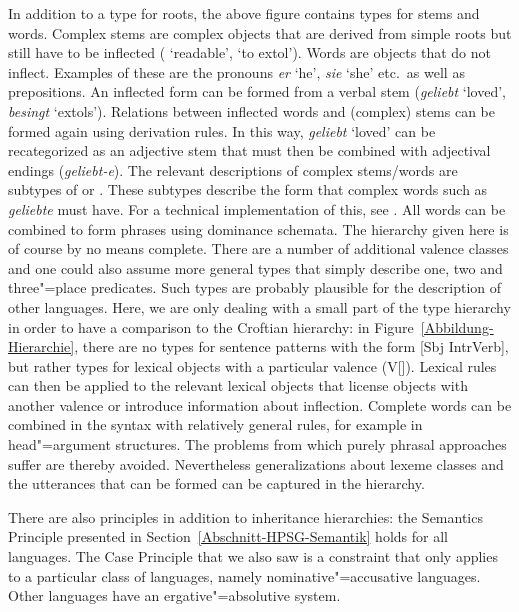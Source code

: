 In addition to a type for roots, the above figure contains types for stems and words. Complex stems are complex objects that are
derived from simple roots but still have to be inflected ( `readable',  `to extol'). Words are objects that do not inflect. Examples of these
are the pronouns \emph{er} `he', \emph{sie} `she' etc.\ as well as prepositions. An inflected form can be formed from a verbal stem
(\emph{geliebt} `loved', \emph{besingt} `extols'). Relations between inflected words and (complex) stems can be formed again using derivation rules. 
In this way, \emph{geliebt} `loved' can be recategorized as an adjective stem that must then be combined with adjectival endings (\emph{geliebt-e}).
The relevant descriptions of complex stems/words are subtypes of 
or . These subtypes describe the form that complex words such as \emph{geliebte} must have. For a technical implementation of this, see
. All words can be combined to form phrases using dominance schemata. The hierarchy given here is of course by no means complete.
There are a number of additional valence classes and one could also assume more general types that simply describe one, two and three"=place predicates. 
Such types are probably plausible for the description of other languages. Here, we are only dealing with a small part of the type hierarchy in order to have
a comparison to the Croftian hierarchy: in Figure~\ref{Abbildung-Hierarchie}, there are no types for
sentence patterns with the form
[Sbj IntrVerb], but rather types for lexical objects with a particular valence
(V[\subcat {}]). Lexical rules can then be applied to the relevant lexical objects that license objects with another valence or introduce
information about inflection. Complete words can be combined in the syntax with relatively general rules, for example in head"=argument structures. The problems
from which purely phrasal approaches suffer are thereby avoided. Nevertheless generalizations about lexeme classes and the utterances that can be formed can be
captured in the hierarchy.

There are also principles in addition to inheritance hierarchies: the Semantics Principle presented in Section~\ref{Abschnitt-HPSG-Semantik} holds
for all languages. The Case Principle that we also saw is a constraint that only applies to a particular
class of languages, namely nominative"=accusative languages.
Other languages have an ergative"=absolutive system.

